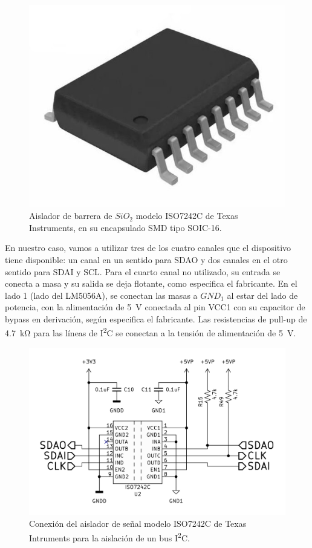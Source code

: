 \begin{figure}[h]
    \centering
    \includegraphics[scale=0.9]{Imagenes/SOIC16.jpg}
    \caption{Aislador de barrera de $SiO_2$ modelo ISO7242C de Texas Instruments, en su encapsulado SMD tipo SOIC-16.}
    \label{encapsulado_iso}
\end{figure}

En nuestro caso, vamos a utilizar tres de los cuatro canales que el dispositivo tiene disponible: un canal en un sentido para SDAO y dos canales en el otro sentido para SDAI y SCL. Para el cuarto canal no utilizado, su entrada se conecta a masa y su salida se deja flotante, como especifica el fabricante. En el lado 1 (lado del LM5056A), se conectan las masas a $GND_1$ al estar del lado de potencia, con la alimentación de \SI[]{5}[]{\volt} conectada al pin VCC1 con su capacitor de bypass en derivación, según especifica el fabricante. Las resistencias de pull-up de \SI[]{4.7}[]{\kilo\ohm} para las líneas de I\textsuperscript{2}C se conectan a la tensión de alimentación de \SI[]{5}[]{\volt}.\\

\begin{figure}[h]
    \centering
    \includegraphics[scale=1.1]{Imagenes/Conexion ISO7242C.png}
    \caption{Conexión del aislador de señal modelo ISO7242C de Texas Intruments para la aislación de un bus I\textsuperscript{2}C.}
    \label{conexion_ISO7242C}
\end{figure}

